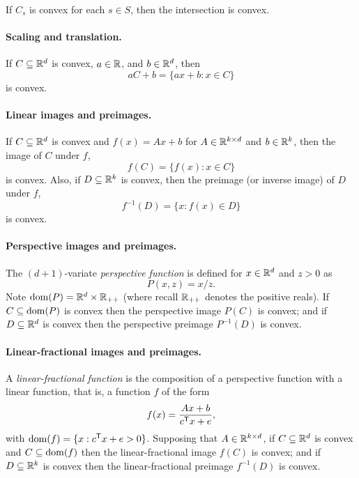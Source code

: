 If $C_s$ is convex for each $s \in S$, then the intersection  is convex. 

\paragraph{Scaling and translation.} 

If $C \subseteq \mathbb{R}^d$ is convex, $a \in \mathbb{R}$, and $b \in \mathbb{R}^d$, then 
\[
aC+b = \{ ax + b : x \in C \}
\]
is convex.

\paragraph{Linear images and preimages.} 

If $C \subseteq \mathbb{R}^d$ is convex and $f(x)=Ax+b$ for $A \in \mathbb{R}^{k \times d}$ and
$b \in \mathbb{R}^k$, then the image of $C$ under $f$, 
\[
f(C) = \{ f(x) : x \in C \}
\]
is convex. Also, if $D \subseteq \mathbb{R}^k$ is convex, then the preimage (or
inverse image) of $D$ under $f$,  
\[
f^{-1}(D) = \{ x : f(x) \in D \}
\]
is convex.

\paragraph{Perspective images and preimages.} 

The $(d+1)$-variate \emph{perspective function} is defined for $x \in \mathbb{R}^d$ and
$z>0$ as   
\[
P(x,z) = x/z.
\]
Note $\operatorname{dom}(P)=\mathbb{R}^d \times \mathbb{R}_{++}$ (where recall $\mathbb{R}_{++}$ denotes the    
positive reals). If $C \subseteq \operatorname{dom}(P)$ is convex then the perspective image
$P(C)$ is convex; and if $D \subseteq \mathbb{R}^d$ is convex then the perspective
preimage $P^{-1}(D)$ is convex.  

\paragraph{Linear-fractional images and preimages.} 

A \emph{linear-fractional function} is the composition of a perspective function
with a linear function, that is, a function $f$ of the form      
\[
f(x) = \frac{Ax + b}{c^{\mathsf{T}} x + e},
\]
with $\operatorname{dom}(f) = \{x : c^{\mathsf{T}} x + e > 0\}$. Supposing that $A \in \mathbb{R}^{k
  \times d}$, if $C \subseteq \mathbb{R}^d$ is convex and $C \subseteq \operatorname{dom}(f)$ then 
the linear-fractional image $f(C)$ is convex; and if $D \subseteq \mathbb{R}^k$ is 
convex then the linear-fractional preimage $f^{-1}(D)$ is convex.


